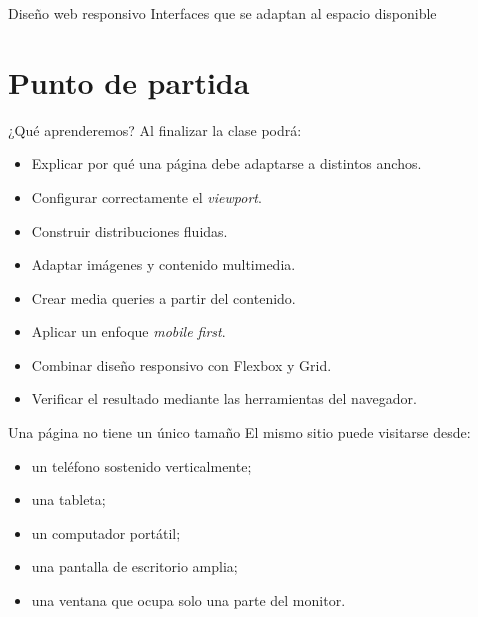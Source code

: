 \documentclass[aspectratio=169,11pt]{beamer}
\begin{document}
    \TitleSlide
    \NormasSlide

    \SectionSlide
    {Diseño web responsivo}
    {Interfaces que se adaptan al espacio disponible}

    \section{Punto de partida}

    \begin{frame}{¿Qué aprenderemos?}
        Al finalizar la clase podrá:

        \begin{itemize}
            \item Explicar por qué una página debe adaptarse a distintos anchos.
            \item Configurar correctamente el \textit{viewport}.
            \item Construir distribuciones fluidas.
            \item Adaptar imágenes y contenido multimedia.
            \item Crear media queries a partir del contenido.
            \item Aplicar un enfoque \textit{mobile first}.
            \item Combinar diseño responsivo con Flexbox y Grid.
            \item Verificar el resultado mediante las herramientas del navegador.
        \end{itemize}
    \end{frame}

    \begin{frame}{Una página no tiene un único tamaño}
        El mismo sitio puede visitarse desde:

        \begin{itemize}
            \item un teléfono sostenido verticalmente;
            \item una tableta;
            \item un computador portátil;
            \item una pantalla de escritorio amplia;
            \item una ventana que ocupa solo una parte del monitor.
        \end{itemize}

    \end{frame}
\end{document}
